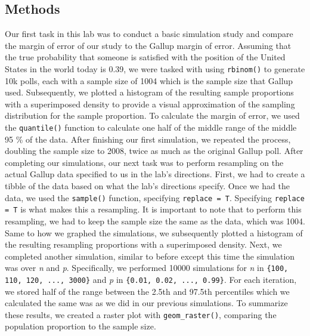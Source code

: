 \documentclass{article}\usepackage[]{graphicx}\usepackage[]{xcolor}
\begin{document}
\begin{multicols}{2}
\section{Methods}
Our first task in this lab was to conduct a basic simulation study and compare the margin of error of our study to the Gallup margin of error. Assuming that the true probability that someone is satisfied with the position of the United States in the world today is 0.39, we were tasked with using \texttt{rbinom()} to generate 10k polls, each with a sample size of 1004 which is the sample size that Gallup used. Subsequently, we plotted a histogram of the resulting sample proportions with a superimposed density to provide a visual approximation of the sampling distribution for the sample proportion. To calculate the margin of error, we used the \texttt{quantile()} function to calculate one half of the middle range of the middle 95 \% of the data. After finishing our first simulation, we repeated the process, doubling the sample size to 2008, twice as much as the original Gallup poll.
\newline
\indent 
After completing our simulations, our next task was to perform resampling on the actual Gallup data specified to us in the lab's directions. First, we had to create a tibble of the data based on what the lab's directions specify. Once we had the data, we used the \texttt{sample()} function, specifying \texttt{replace = T}. Specifying \texttt{replace = T} is what makes this a resampling. It is important to note that to perform this resampling, we had to keep the sample size the same as the data, which was 1004. Same to how we graphed the simulations, we  subsequently plotted a histogram of the resulting resampling proportions with a superimposed density.
\newline
\indent 
Next, we completed another simulation, similar to before except this time the simulation was over \textit{n} and \textit{p}. Specifically, we performed 10000 simulations for \textit{n} in \verb|{100, 110, 120, ..., 3000}| and \textit{p} in \verb|{0.01, 0.02, ..., 0.99}|. For each iteration, we stored half of the range between the 2.5th and 97.5th percentiles which we calculated the same was as we did in our previous simulations. To summarize these results, we created a raster plot with \texttt{geom\_raster()}, comparing the population proportion to the sample size.
\newline
\indent 

\end{multicols}
\end{document}
